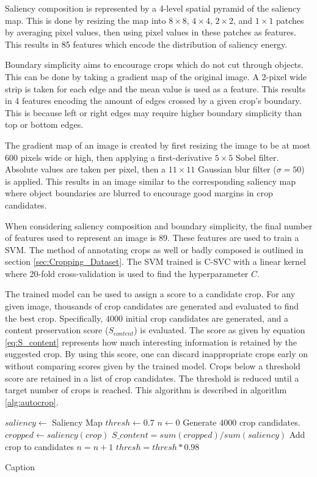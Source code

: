 Saliency composition is represented by a 4-level spatial pyramid of the saliency
map.
This is done by resizing the map into $8\times8$, $4\times4$, $2\times2$, and
$1\times1$ patches
by averaging pixel values, then using pixel values in these patches as features.
This results in 85 features which encode the distribution of saliency energy.

Boundary simplicity aims to encourage crops which do not cut through objects.
This can be done by taking a gradient map of the original image.
A 2-pixel wide strip is taken for each edge and the mean value is used as a
feature.
This results in 4 features encoding the amount of edges crossed by a given
crop's boundary.
This is because left or right edges may require higher boundary simplicity than
top or bottom edges.

The gradient map of an image is created by first resizing the image to be at
most 600 pixels wide or high, then applying a first-derivative $5\times5$ Sobel
filter.
Absolute values are taken per pixel, then a $11\times11$ Gaussian blur filter
($\sigma=50$) is applied.
This results in an image similar to the corresponding saliency map where object
boundaries are blurred to encourage good margins in crop candidates.

When considering saliency composition and boundary simplicity, the final number
of features used to represent an image is 89.
These features are used to train a SVM.
The method of annotating crops as well or badly composed is outlined in section
\ref{sec:Cropping_Dataset}.
The SVM trained is C-SVC with a linear kernel where 20-fold cross-validation is
used to find the hyperparameter $C$.

The trained model can be used to assign a score to a candidate crop. For any
given image, thousands of crop candidates are generated and evaluated to find
the best crop.
Specifically, $4000$ initial crop candidates are generated, and a content
preservation score ($S_{content}$) is evaluated.
The score as given by equation \ref{eq:S_content} represents how much
interesting information is retained by the suggested crop.
By using this score, one can discard inappropriate crops early on without
comparing scores given by the trained model.
Crops below a threshold score are retained in a list of crop candidates.
The threshold is reduced until a target number of crops is reached.
This algorithm is described in algorithm \ref{alg:autocrop}.

\begin{algorithm}
\begin{algorithmic}[1]

\State $saliency \gets$ Saliency Map
\State $thresh \gets 0.7$
\State $n \gets 0$
    \Repeat
    \State Generate $4000$ crop candidates.
        \State $cropped \gets saliency(crop)$
        \State $S\_content = sum(cropped) / sum(saliency)$
            \State Add crop to candidates
            \State $n = n + 1$
        \EndIf
    \EndFor
    \State $thresh = thresh * 0.98$
\end{algorithmic}
\caption{Caption \label{alg:autocrop}}
\end{algorithm}

